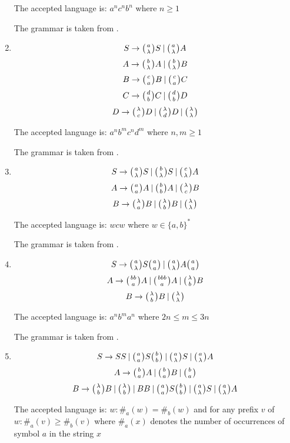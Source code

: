 \begin{enumerate}
{    The accepted language is: $a^nc^nb^n$ where $n \geq 1$

    The grammar is taken from \cite{WK_GRAMMARS_1}.

  }

  \item{
    $$S \rightarrow \wkpair{a}{\lambda} S \:|\: \wkpair{a}{\lambda} A$$
    $$A \rightarrow \wkpair{b}{\lambda} A \:|\: \wkpair{b}{\lambda} B$$
    $$B \rightarrow \wkpair{c}{a} B \:|\: \wkpair{c}{a} C$$
    $$C \rightarrow \wkpair{d}{b} C \:|\: \wkpair{d}{b} D$$
    $$D \rightarrow \wkpair{\lambda}{c} D \:|\: \wkpair{\lambda}{d} D \:|\: \wkpair{\lambda}{\lambda}$$

    The accepted language is: $a^nb^mc^nd^m$ where $n, m \geq 1$

    The grammar is taken from \cite{WK_GRAMMARS_1}.
  }

  \item{
    $$S \rightarrow \wkpair{a}{\lambda} S \:|\: \wkpair{b}{\lambda} S \:|\: \wkpair{c}{\lambda} A$$
    $$A \rightarrow \wkpair{a}{a} A \:|\: \wkpair{b}{b} A \:|\: \wkpair{\lambda}{c} B$$
    $$B \rightarrow \wkpair{\lambda}{a} B \:|\: \wkpair{\lambda}{b} B \:|\: \wkpair{\lambda}{\lambda}$$

    The accepted language is: $wcw$ where $w \in \{a, b\}^*$

    The grammar is taken from \cite{WK_GRAMMARS_1}.
  }

  \item{
    $$S \rightarrow \wkpair{a}{\lambda} S \wkpair{a}{a} \:|\: \wkpair{a}{\lambda} A \wkpair{a}{a} $$
    $$A \rightarrow \wkpair{bb}{a} A \:|\: \wkpair{bbb}{a} A \:|\: \wkpair{\lambda}{b} B$$
    $$B \rightarrow \wkpair{\lambda}{b} B \:|\: \wkpair{\lambda}{\lambda}$$

    The accepted language is: $a^nb^ma^n$ where $2n \leq m \leq 3n$

    The grammar is taken from \cite{WK_GRAMMARS_1}.
  }

  \item{
    $$S \rightarrow S S \:|\: \wkpair{a}{a} S \wkpair{b}{b} \:|\: \wkpair{a}{\lambda} S \:|\: \wkpair{a}{\lambda} A$$
    $$A \rightarrow \wkpair{b}{a} A \:|\: \wkpair{b}{a} B \:|\: \wkpair{b}{a}$$
    $$B \rightarrow \wkpair{\lambda}{b} B \:|\: \wkpair{\lambda}{b} \:|\: B B \:|\: \wkpair{a}{a} S \wkpair{b}{b} \:|\: \wkpair{a}{\lambda} S \:|\: \wkpair{a}{\lambda} A$$

    The accepted language is: $w: \#_a(w) = \#_b(w)$ and for any prefix $v$ of $w: \#_a(v) \geq \#_b(v)$  where $\#_a(x)$ denotes the number of occurrences of symbol $a$ in the string $x$

}
\end{enumerate}
